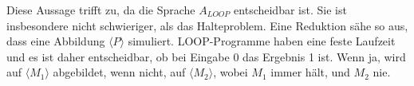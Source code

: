 Diese Aussage trifft zu, da die Sprache $A_{LOOP}$ entscheidbar ist. Sie ist insbesondere nicht schwieriger, als das Halteproblem. Eine Reduktion sähe so aus, dass  eine Abbildung $\langle P \rangle$ simuliert. LOOP-Programme haben eine feste Laufzeit und es ist daher entscheidbar, ob bei Eingabe 0 das Ergebnis 1 ist. Wenn ja, wird auf $\langle M_1 \rangle$ abgebildet, wenn nicht, auf $\langle M_2 \rangle$, wobei $M_1$ immer hält, und $M_2$ nie.